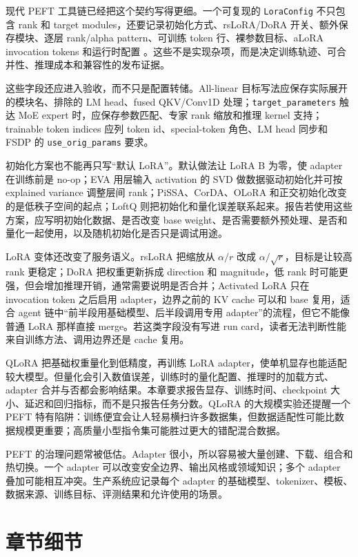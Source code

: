 \documentclass[UTF8,zihao=-4,openany]{ctexbook}
\begin{document}
现代 PEFT 工具链已经把这个契约写得更细。一个可复现的 \texttt{LoraConfig} 不只包含 rank 和 target modules，还要记录初始化方式、rsLoRA/DoRA 开关、额外保存模块、逐层 rank/alpha pattern、可训练 token 行、裸参数目标、aLoRA invocation tokens 和运行时配置 \cite{huggingface2026peftlora}。这些不是实现杂项，而是决定训练轨迹、可合并性、推理成本和兼容性的发布证据。

这些字段还应进入验收，而不只是配置转储。All-linear 目标写法应保存实际展开的模块名、排除的 LM head、fused QKV/Conv1D 处理；\texttt{target\_parameters} 触达 MoE expert 时，应保存参数匹配、专家 rank 缩放和推理 kernel 支持；trainable token indices 应列 token id、special-token 角色、LM head 同步和 FSDP 的 \texttt{use\_orig\_params} 要求。

初始化方案也不能再只写“默认 LoRA”。默认做法让 LoRA B 为零，使 adapter 在训练前是 no-op；EVA 用层输入 activation 的 SVD 做数据驱动初始化并可按 explained variance 调整层间 rank；PiSSA、CorDA、OLoRA 和正交初始化改变的是低秩子空间的起点；LoftQ 则把初始化和量化误差联系起来。报告若使用这些方案，应写明初始化数据、是否改变 base weight、是否需要额外预处理、是否和量化一起使用，以及随机初始化是否只是调试用途。

LoRA 变体还改变了服务语义。rsLoRA 把缩放从 $\alpha/r$ 改成 $\alpha/\sqrt r$，目标是让较高 rank 更稳定；DoRA 把权重更新拆成 direction 和 magnitude，低 rank 时可能更强，但会增加推理开销，通常需要说明是否合并；Activated LoRA 只在 invocation token 之后启用 adapter，边界之前的 KV cache 可以和 base 复用，适合 agent 链中“前半段用基础模型、后半段调用专用 adapter”的流程，但它不能像普通 LoRA 那样直接 merge。若这类字段没有写进 run card，读者无法判断性能来自训练方法、调用边界还是 cache 复用。

QLoRA 把基础权重量化到低精度，再训练 LoRA adapter，使单机显存也能适配较大模型。但量化会引入数值误差，训练时的量化配置、推理时的加载方式、adapter 合并与否都会影响结果。本章要求报告显存、训练时间、checkpoint 大小、延迟和回归指标，而不是只报告任务分数。QLoRA 的大规模实验还提醒一个 PEFT 特有陷阱：训练便宜会让人轻易横扫许多数据集，但数据适配性可能比数据规模更重要；高质量小型指令集可能胜过更大的错配混合数据。

PEFT 的治理问题常被低估。Adapter 很小，所以容易被大量创建、下载、组合和热切换。一个 adapter 可以改变安全边界、输出风格或领域知识；多个 adapter 叠加可能相互冲突。生产系统应记录每个 adapter 的基础模型、tokenizer、模板、数据来源、训练目标、评测结果和允许使用的场景。

\section{章节细节}
\end{document}
